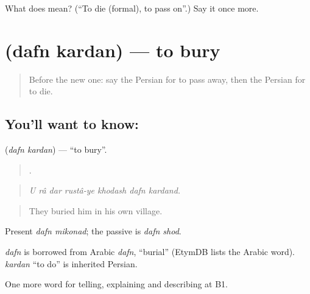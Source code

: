 \begin{tcolorbox}[breakable,colback=teal!4,colframe=teal!35!black,title={Before you move on}]
What does   mean? (\textquotedblleft{}To die (formal), to pass on\textquotedblright{}.) Say it once more.
\end{tcolorbox}
\section[\texorpdfstring{\fa{دفن} \fa{کردن} (dafn kardan)}{دفن کردن (dafn kardan)}]{  (dafn kardan) — to bury}

\label{lesson:FA-C337-dafn-kardan}



\begin{quote}
Before the new one: say the Persian for to pass away, then the Persian for to die.
\end{quote}

\subsection*{You'll want to know:  }
\textbf{ } (\emph{dafn kardan}) — \textquotedblleft{}to bury\textquotedblright{}.

\begin{quote}
      .
\end{quote}

\begin{quote}
\emph{U râ dar rustâ-ye khodash dafn kardand.}
\end{quote}

\begin{quote}
They buried him in his own village.
\end{quote}

Present \emph{dafn mikonad}; the passive is \emph{dafn shod}.

\begin{cousinweb}
\emph{dafn} is borrowed from Arabic \emph{dafn}, \textquotedblleft{}burial\textquotedblright{} (EtymDB lists the Arabic word). \emph{kardan} \textquotedblleft{}to do\textquotedblright{} is inherited Persian.
\end{cousinweb}

\begin{grammarlens}[title={What you've built}]
One more word for telling, explaining and describing at B1.
\end{grammarlens}

